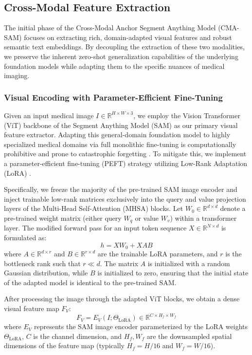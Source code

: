 \documentclass[onecolumn]{IEEEtran}
\numberwithin{equation}{section}
\theoremstyle{definition}
\theoremstyle{remark}
\begin{document}
\subsection{Cross-Modal Feature Extraction}

The initial phase of the Cross-Modal Anchor Segment Anything Model (CMA-SAM) focuses on extracting rich, domain-adapted visual features and robust semantic text embeddings. By decoupling the extraction of these two modalities, we preserve the inherent zero-shot generalization capabilities of the underlying foundation models while adapting them to the specific nuances of medical imaging.

\subsubsection{Visual Encoding with Parameter-Efficient Fine-Tuning}

Given an input medical image $I \in \mathbb{R}^{H \times W \times 3}$, we employ the Vision Transformer (ViT) backbone of the Segment Anything Model (SAM) \cite{kirillov2023segment} as our primary visual feature extractor. Adapting this general-domain foundation model to highly specialized medical domains via full monolithic fine-tuning is computationally prohibitive and prone to catastrophic forgetting \cite{cheng2024unleashing, wu2025medical}. To mitigate this, we implement a parameter-efficient fine-tuning (PEFT) strategy utilizing Low-Rank Adaptation (LoRA) \cite{zhang2023customized}.

Specifically, we freeze the majority of the pre-trained SAM image encoder and inject trainable low-rank matrices exclusively into the query and value projection layers of the Multi-Head Self-Attention (MHSA) blocks. Let $W_0 \in \mathbb{R}^{d \times d}$ denote a pre-trained weight matrix (either query $W_q$ or value $W_v$) within a transformer layer. The modified forward pass for an input token sequence $X \in \mathbb{R}^{N \times d}$ is formulated as:
\begin{equation}
    h = X W_0 + X A B
\end{equation}
where $A \in \mathbb{R}^{d \times r}$ and $B \in \mathbb{R}^{r \times d}$ are the trainable LoRA parameters, and $r$ is the bottleneck rank such that $r \ll d$. The matrix $A$ is initialized with a random Gaussian distribution, while $B$ is initialized to zero, ensuring that the initial state of the adapted model is identical to the pre-trained SAM. 

After processing the image through the adapted ViT blocks, we obtain a dense visual feature map $F_V$:
\begin{equation}
    F_V = E_V(I; \Theta_{\text{LoRA}}) \in \mathbb{R}^{C \times H_f \times W_f}
\end{equation}
where $E_V$ represents the SAM image encoder parameterized by the LoRA weights $\Theta_{\text{LoRA}}$, $C$ is the channel dimension, and $H_f, W_f$ are the downsampled spatial dimensions of the feature map (typically $H_f = H/16$ and $W_f = W/16$).
\end{document}
